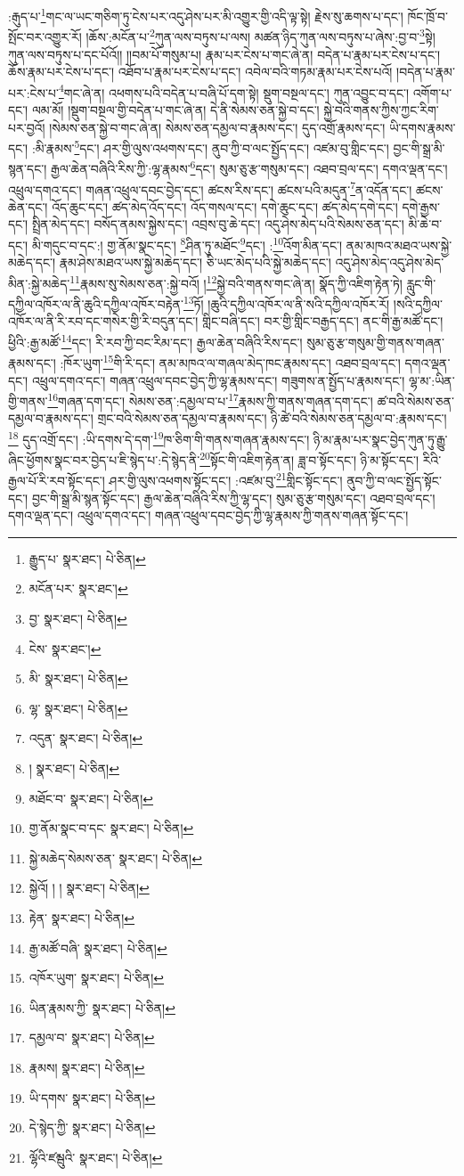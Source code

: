 :རྒུད་པ་\footnote{རྒྱུད་པ་  སྣར་ཐང་།  པེ་ཅིན། }གང་ལ་ཡང་གཅིག་ཏུ་ངེས་པར་འདུ་ཤེས་པར་མི་འགྱུར་གྱི་འདི་ལྟ་སྟེ། རྗེས་སུ་ཆགས་པ་དང་། ཁོང་ཁྲོ་བ་སྤོང་བར་འགྱུར་རོ། །ཆོས་:མངོན་པ་\footnote{མངོན་པར་  སྣར་ཐང་། }ཀུན་ལས་བཏུས་པ་ལས། མཚན་ཉིད་ཀུན་ལས་བཏུས་པ་ཞེས་:བྱ་བ་\footnote{བྱ་  སྣར་ཐང་།  པེ་ཅིན། }སྟེ། ཀུན་ལས་བཏུས་པ་དང་པོའོ།། །།བམ་པོ་གསུམ་པ། རྣམ་པར་ངེས་པ་གང་ཞེ་ན། བདེན་པ་རྣམ་པར་ངེས་པ་དང་། ཆོས་རྣམ་པར་ངེས་པ་དང་། འཐོབ་པ་རྣམ་པར་ངེས་པ་དང་། འབེལ་བའི་གཏམ་རྣམ་པར་ངེས་པའོ། །བདེན་པ་རྣམ་པར་:ངེས་པ་\footnote{ངེས་  སྣར་ཐང་། }གང་ཞེ་ན། འཕགས་པའི་བདེན་པ་བཞི་པོ་དག་སྟེ། སྡུག་བསྔལ་དང་། ཀུན་འབྱུང་བ་དང་། འགོག་པ་དང་། ལམ་མོ། །སྡུག་བསྔལ་གྱི་བདེན་པ་གང་ཞེ་ན། དེ་ནི་སེམས་ཅན་སྐྱེ་བ་དང་། སྐྱེ་བའི་གནས་ཀྱིས་ཀྱང་རིག་པར་བྱའོ། །སེམས་ཅན་སྐྱེ་བ་གང་ཞེ་ན། སེམས་ཅན་དམྱལ་བ་རྣམས་དང་། དུད་འགྲོ་རྣམས་དང་། ཡི་དགས་རྣམས་དང་། :མི་རྣམས་\footnote{མི་  སྣར་ཐང་།  པེ་ཅིན། }དང་། ཤར་གྱི་ལུས་འཕགས་དང་། ནུབ་ཀྱི་བ་ལང་སྤྱོད་དང་། འཛམ་བུ་གླིང་དང་། བྱང་གི་སྒྲ་མི་སྙན་དང་། རྒྱལ་ཆེན་བཞིའི་རིས་ཀྱི་:ལྷ་རྣམས་\footnote{ལྷ་  སྣར་ཐང་།  པེ་ཅིན། }དང་། སུམ་ཅུ་རྩ་གསུམ་དང་། འཐབ་བྲལ་དང་། དགའ་ལྡན་དང་། འཕྲུལ་དགའ་དང་། གཞན་འཕྲུལ་དབང་བྱེད་དང་། ཚངས་རིས་དང་། ཚངས་པའི་མདུན་\footnote{འདུན་  སྣར་ཐང་།  པེ་ཅིན། }ན་འདོན་དང་། ཚངས་ཆེན་དང་། འོད་ཆུང་དང་། ཚད་མེད་འོད་དང་། འོད་གསལ་དང་། དགེ་ཆུང་དང་། ཚད་མེད་དགེ་དང་། དགེ་རྒྱས་དང་། སྤྲིན་མེད་དང་། བསོད་ནམས་སྐྱེས་དང་། འབྲས་བུ་ཆེ་དང་། འདུ་ཤེས་མེད་པའི་སེམས་ཅན་དང་། མི་ཆེ་བ་དང་། མི་གདུང་བ་དང་:། གྱ་ནོམ་སྣང་དང་། \footnote{།    སྣར་ཐང་།  པེ་ཅིན། }ཤིན་ཏུ་མཐོང་\footnote{མཐོང་བ་  སྣར་ཐང་།  པེ་ཅིན། }དང་། :\footnote{གྱ་ནོམ་སྣང་བ་དང་  སྣར་ཐང་།  པེ་ཅིན། }འོག་མིན་དང་། ནམ་མཁའ་མཐའ་ཡས་སྐྱེ་མཆེད་དང་། རྣམ་ཤེས་མཐའ་ཡས་སྐྱེ་མཆེད་དང་། ཅི་ཡང་མེད་པའི་སྐྱེ་མཆེད་དང་། འདུ་ཤེས་མེད་འདུ་ཤེས་མེད་མིན་:སྐྱེ་མཆེད་\footnote{སྐྱེ་མཆེད་སེམས་ཅན་  སྣར་ཐང་།  པེ་ཅིན། }རྣམས་སུ་སེམས་ཅན་:སྐྱེ་བའོ། །\footnote{སྐྱེའོ། ། །  སྣར་ཐང་།  པེ་ཅིན། }སྐྱེ་བའི་གནས་གང་ཞེ་ན། སྣོད་ཀྱི་འཇིག་རྟེན་ཏེ། རླུང་གི་དཀྱིལ་འཁོར་ལ་ནི་ཆུའི་དཀྱིལ་འཁོར་བརྟེན་\footnote{རྟེན་  སྣར་ཐང་།  པེ་ཅིན། }ཏོ། །ཆུའི་དཀྱིལ་འཁོར་ལ་ནི་སའི་དཀྱིལ་འཁོར་རོ། །སའི་དཀྱིལ་འཁོར་ལ་ནི་རི་རབ་དང་གསེར་གྱི་རི་བདུན་དང་། གླིང་བཞི་དང་། བར་གྱི་གླིང་བརྒྱད་དང་། ནང་གི་རྒྱ་མཚོ་དང་། ཕྱིའི་:རྒྱ་མཚོ་\footnote{རྒྱ་མཚོ་བཞི་  སྣར་ཐང་།  པེ་ཅིན། }དང་། རི་རབ་ཀྱི་བང་རིམ་དང་། རྒྱལ་ཆེན་བཞིའི་རིས་དང་། སུམ་ཅུ་རྩ་གསུམ་གྱི་གནས་གཞན་རྣམས་དང་། :ཁོར་ཡུག་\footnote{འཁོར་ཡུག་  སྣར་ཐང་།  པེ་ཅིན། }གི་རི་དང་། ནམ་མཁའ་ལ་གཞལ་མེད་ཁང་རྣམས་དང་། འཐབ་བྲལ་དང་། དགའ་ལྡན་དང་། འཕྲུལ་དགའ་དང་། གཞན་འཕྲུལ་དབང་བྱེད་ཀྱི་ལྷ་རྣམས་དང་། གཟུགས་ན་སྤྱོད་པ་རྣམས་དང་། ལྷ་མ་:ཡིན་གྱི་གནས་\footnote{ཡིན་རྣམས་ཀྱི་  སྣར་ཐང་།  པེ་ཅིན། }གཞན་དག་དང་། སེམས་ཅན་:དམྱལ་བ་པ་\footnote{དམྱལ་བ་  སྣར་ཐང་།  པེ་ཅིན། }རྣམས་ཀྱི་གནས་གཞན་དག་དང་། ཚ་བའི་སེམས་ཅན་དམྱལ་བ་རྣམས་དང་། གྲང་བའི་སེམས་ཅན་དམྱལ་བ་རྣམས་དང་། ཉི་ཚེ་བའི་སེམས་ཅན་དམྱལ་བ་:རྣམས་དང་།\footnote{རྣམས།  སྣར་ཐང་།  པེ་ཅིན། } དུད་འགྲོ་དང་། :ཡི་དགས་དེ་དག་\footnote{ཡི་དགས་  སྣར་ཐང་།  པེ་ཅིན། }ཁ་ཅིག་གི་གནས་གཞན་རྣམས་དང་། ཉི་མ་རྣམ་པར་སྣང་བྱེད་ཀུན་ཏུ་རྒྱུ་ཞིང་ཕྱོགས་སྣང་བར་བྱེད་པ་ཇི་སྙེད་པ་:དེ་སྙེད་ནི་\footnote{དེ་སྙེད་ཀྱི་  སྣར་ཐང་།  པེ་ཅིན། }སྟོང་གི་འཇིག་རྟེན་ན། ཟླ་བ་སྟོང་དང་། ཉི་མ་སྟོང་དང་། རིའི་རྒྱལ་པོ་རི་རབ་སྟོང་དང་། ཤར་གྱི་ལུས་འཕགས་སྟོང་དང་། :འཛམ་བུ་\footnote{ལྷོའི་ཛམྦུའི་  སྣར་ཐང་།  པེ་ཅིན། }གླིང་སྟོང་དང་། ནུབ་ཀྱི་བ་ལང་སྤྱོད་སྟོང་དང་། བྱང་གི་སྒྲ་མི་སྙན་སྟོང་དང་། རྒྱལ་ཆེན་བཞིའི་རིས་ཀྱི་ལྷ་དང་། སུམ་ཅུ་རྩ་གསུམ་དང་། འཐབ་བྲལ་དང་། དགའ་ལྡན་དང་། འཕྲུལ་དགའ་དང་། གཞན་འཕྲུལ་དབང་བྱེད་ཀྱི་ལྷ་རྣམས་ཀྱི་གནས་གཞན་སྟོང་དང་། 